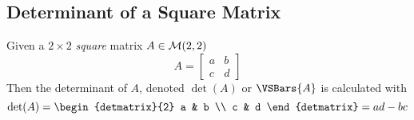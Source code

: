 \subsection{Determinant of a Square Matrix}

\begin{definition}
    Given a $2 \times 2$ \textit{square} matrix $A \in \mathcal{M}(2, 2)$
    \begin{equation}
        A = \begin{bmatrix}
            a & b \\
            c & d
        \end{bmatrix}
    \end{equation}
    Then the determinant of $A$, denoted $\det(A)$ or $\VSBars{A}$ is calculated with
    \begin{equation}
        \det(A) = 
        \begin{detmatrix}{2}
            a & b \\
            c & d
        \end{detmatrix}
        =
        a d - b c
    \end{equation}
\end{definition}

